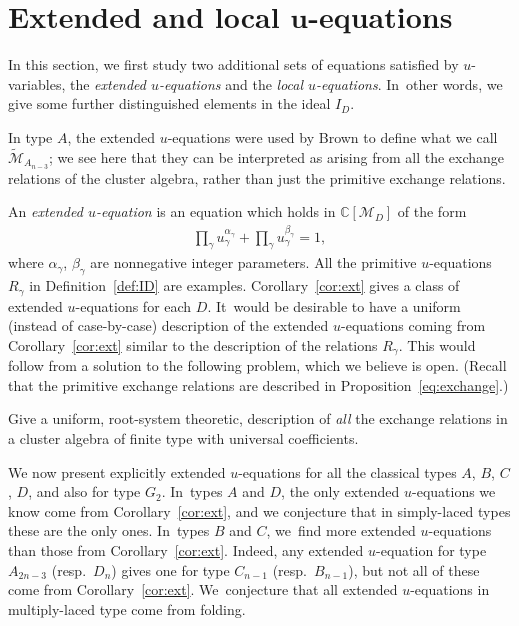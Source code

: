 \documentclass[10pt,a4paper]{amsart}
\def\C{{\mathbb C}}
\def\M{{\mathcal{M}}}
\def\tM{{\widetilde {\mathcal{M}}}}
\numberwithin{equation}{section}
\begin{document}
\section[Extended and local u-equations]{Extended and local $\boldsymbol u$-equations}

In this section, we first study two additional sets of equations satisfied by $u$-variables, the {\it exten\-ded $u$-equations} and the {\it local $u$-equations}. In~other words, we give some further distinguished elements in the ideal $I_D$.

In type $A$, the extended $u$-equations were used by Brown \cite{Brown} to define what we call $\tM_{A_{n-3}}$; we see here that they can be interpreted as arising from all the exchange relations of the cluster algebra, rather than just the primitive exchange relations.

\bigskip{} %
An \emph{extended $u$-equation} is an equation which holds in $\C[\M_D]$ of the form
\begin{gather}\label{eq:extu}
\prod_\gamma u_\gamma^{\alpha_\gamma} + \prod_\gamma u_\gamma^{\beta_\gamma} =1,
\end{gather}
where $\alpha_\gamma$, $\beta_\gamma$ are nonnegative integer parameters. All the primitive $u$-equations $R_\gamma$ in Definition~\ref{def:ID} are examples. Corollary~\ref{cor:ext} gives a class of extended $u$-equations for each $D$. It~would be desirable to have a uniform (instead of case-by-case) description of the extended $u$-equations coming from Corollary~\ref{cor:ext} similar to the description of the relations $R_\gamma$. This would follow from a solution to the following problem, which we believe is open. (Recall that the primitive exchange relations are described in Proposition~\ref{eq:exchange}.)

\begin{problem}
Give a uniform, root-system theoretic, description of {\it all} the exchange relations in a cluster algebra of finite type with universal coefficients.
\end{problem}

We now present explicitly extended $u$-equations for all the classical types $A$, $B$, $C$, $D$, and also for type $G_2$. In~types $A$ and $D$, the only extended $u$-equations we know come from Corollary~\ref{cor:ext}, and we conjecture that in simply-laced types these are the only ones. In~types $B$ and $C$, we~find more extended $u$-equations than those from Corollary~\ref{cor:ext}. Indeed, any extended $u$-equation for type $A_{2n-3}$ (resp.\ $D_n$) gives one for type $C_{n-1}$ (resp.\ $B_{n-1}$), but not all of these come from Corollary~\ref{cor:ext}. We~conjecture that all extended $u$-equations in multiply-laced type come from folding.
\end{document}
